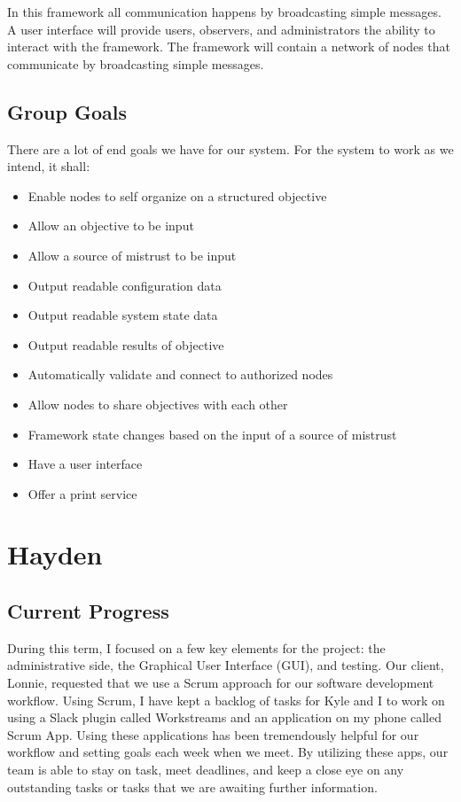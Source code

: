 \documentclass[draftclsnofoot, onecolumn, compsoc, 10pt]{IEEEtran}
\begin{document}
In this framework all communication happens by broadcasting simple messages. A user interface will provide users, observers, and administrators the ability to interact with the framework. The framework will contain a network of nodes that communicate by broadcasting simple messages. 


\subsection{Group Goals}
There are a lot of end goals we have for our system. For the system to work as we intend, it shall:
\begin{itemize}
\item Enable nodes to self organize on a structured objective
\item Allow an objective to be input
\item Allow a source of mistrust to be input
\item Output readable configuration data
\item Output readable system state data
\item Output readable results of objective
\item Automatically validate and connect to authorized nodes
\item Allow nodes to share objectives with each other
\item Framework state changes based on the input of a source of mistrust
\item Have a user interface
\item Offer a print service
\end{itemize}


\section{Hayden}
\subsection{Current Progress}
During this term, I focused on a few key elements for the project: the administrative side, the Graphical User Interface (GUI), and testing. Our client, Lonnie, requested that we use a Scrum approach for our software development workflow. Using Scrum, I have kept a backlog of tasks for Kyle and I to work on using a Slack plugin called Workstreams and an application on my phone called Scrum App. Using these applications has been tremendously helpful for our workflow and setting goals each week when we meet. By utilizing these apps, our team is able to stay on task, meet deadlines, and keep a close eye on any outstanding tasks or tasks that we are awaiting further information. 
\end{document}
